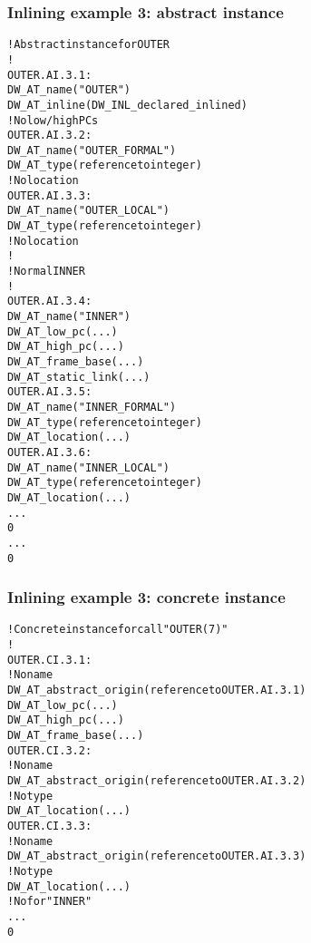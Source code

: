 \subsubsection{Inlining example 3: abstract instance}
\label{app:inliningexample3abstractinstance}
\begin{alltt}
    ! Abstract instance for OUTER
    !
OUTER.AI.3.1:
        DW\_AT\_name("OUTER")
        DW\_AT\_inline(DW\_INL\_declared\_inlined)
        ! No low/high PCs
OUTER.AI.3.2:
            DW\_AT\_name("OUTER\_FORMAL")
            DW\_AT\_type(reference to integer)
            ! No location
OUTER.AI.3.3:
            DW\_AT\_name("OUTER\_LOCAL")
            DW\_AT\_type(reference to integer)
            ! No location
        !
        ! Normal INNER
        !
OUTER.AI.3.4:
            DW\_AT\_name("INNER")
            DW\_AT\_low\_pc(...)
            DW\_AT\_high\_pc(...)
            DW\_AT\_frame\_base(...)
            DW\_AT\_static\_link(...)
OUTER.AI.3.5:
                DW\_AT\_name("INNER\_FORMAL")
                DW\_AT\_type(reference to integer)
                DW\_AT\_location(...)
OUTER.AI.3.6:
                DW\_AT\_name("INNER\_LOCAL")
                DW\_AT\_type(reference to integer)
                DW\_AT\_location(...)
            ...
            0
        ...
        0
\end{alltt}


\subsubsection{Inlining example 3: concrete instance}
\label{app:inliningexample3concreteinstance}
\begin{alltt}
    ! Concrete instance for call "OUTER(7)"
    !
OUTER.CI.3.1:
        ! No name
        DW\_AT\_abstract\_origin(reference to OUTER.AI.3.1)
        DW\_AT\_low\_pc(...)
        DW\_AT\_high\_pc(...)
        DW\_AT\_frame\_base(...)
OUTER.CI.3.2:
            ! No name
            DW\_AT\_abstract\_origin(reference to OUTER.AI.3.2)
            ! No type
            DW\_AT\_location(...)
OUTER.CI.3.3:
            ! No name
            DW\_AT\_abstract\_origin(reference to OUTER.AI.3.3)
            ! No type
            DW\_AT\_location(...)
        ! No  for "INNER"
        ...
        0
\end{alltt}

